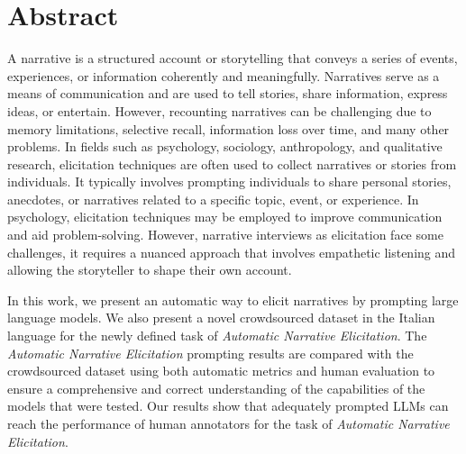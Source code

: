 \chapter*{Abstract} %
\label{abtract}


    A narrative is a structured account or storytelling that conveys a series of events, experiences, or information coherently and meaningfully. Narratives serve as a means of communication and are used to tell stories, share information, express ideas, or entertain. However, recounting narratives can be challenging due to memory limitations, selective recall, information loss over time, and many other problems. In fields such as psychology, sociology, anthropology, and qualitative research, elicitation techniques are often used to collect narratives or stories from individuals. It typically involves prompting individuals to share personal stories, anecdotes, or narratives related to a specific topic, event, or experience. In psychology, elicitation techniques may be employed to improve communication and aid problem-solving. However, narrative interviews as elicitation face some challenges, it requires a nuanced approach that involves empathetic listening and allowing the storyteller to shape their own account.

In this work, we present an automatic way to elicit narratives by prompting large language models. We also present a novel crowdsourced dataset in the Italian language for the newly defined task of \emph{Automatic Narrative Elicitation}. The \emph{Automatic Narrative Elicitation} prompting results are compared with the crowdsourced dataset using both automatic metrics and human evaluation to ensure a comprehensive and correct understanding of the capabilities of the models that were tested. Our results show that adequately prompted LLMs can reach the performance of human annotators for the task of \emph{Automatic Narrative Elicitation}.




